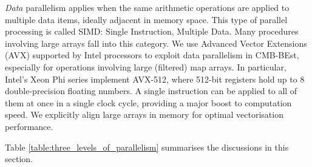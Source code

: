 \textit{Data} parallelism applies when the same arithmetic operations are applied to multiple data items, ideally adjacent in memory space. This type of parallel processing is called SIMD: Single Instruction, Multiple Data. Many procedures involving large arrays fall into this category. We use Advanced Vector Extensions (AVX) supported by Intel processors to exploit data parallelism in CMB-BEst, especially for operations involving large (filtered) map arrays. In particular, Intel's Xeon Phi series implement AVX-512, where 512-bit registers hold up to 8 double-precision floating numbers. A single instruction can be applied to all of them at once in a single clock cycle, providing a major boost to computation speed. We explicitly align large arrays in memory for optimal vectorisation performance.

Table \ref{table:three_levels_of_parallelism} summarises the discussions in this section.

